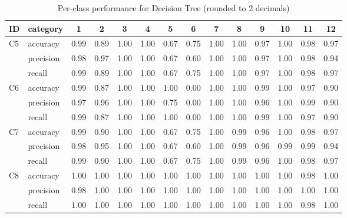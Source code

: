 \documentclass[11pt]{article}
\begin{document}
\begin{table} [h]
  \centering
  \begin{tabular}{llcccccccccccc}
      \toprule
      ID & category & 1 & 2 & 3 & 4 & 5 & 6 & 7 & 8 & 9 & 10 & 11 & 12 \\
      \midrule

      \multirow{3}{*}{C5}
        & accuracy  & 0.99 & 0.89 & 1.00 & 1.00 & 0.67 & 0.75 & 1.00 & 1.00 & 0.97 & 1.00 & 0.98 & 0.97 \\
        & precision & 0.98 & 0.97 & 1.00 & 1.00 & 0.67 & 0.60 & 1.00 & 1.00 & 0.97 & 1.00 & 0.98 & 0.94 \\
        & recall    & 0.99 & 0.89 & 1.00 & 1.00 & 0.67 & 0.75 & 1.00 & 1.00 & 0.97 & 1.00 & 0.98 & 0.97 \\
      \midrule

      \multirow{3}{*}{C6}
        & accuracy  & 0.99 & 0.87 & 1.00 & 1.00 & 1.00 & 0.00 & 1.00 & 1.00 & 0.99 & 1.00 & 0.97 & 0.90 \\
        & precision & 0.97 & 0.96 & 1.00 & 1.00 & 0.75 & 0.00 & 1.00 & 1.00 & 0.96 & 1.00 & 0.99 & 0.90 \\
        & recall    & 0.99 & 0.87 & 1.00 & 1.00 & 1.00 & 0.00 & 1.00 & 1.00 & 0.99 & 1.00 & 0.97 & 0.90 \\
      \midrule

      \multirow{3}{*}{C7}
        & accuracy  & 0.99 & 0.90 & 1.00 & 1.00 & 0.67 & 0.75 & 1.00 & 0.99 & 0.96 & 1.00 & 0.98 & 0.97 \\
        & precision & 0.98 & 0.95 & 1.00 & 1.00 & 0.67 & 0.60 & 1.00 & 0.99 & 0.96 & 0.99 & 0.99 & 0.94 \\
        & recall    & 0.99 & 0.90 & 1.00 & 1.00 & 0.67 & 0.75 & 1.00 & 0.99 & 0.96 & 1.00 & 0.98 & 0.97 \\
      \midrule

      \multirow{3}{*}{C8}
        & accuracy  & 1.00 & 1.00 & 1.00 & 1.00 & 1.00 & 1.00 & 1.00 & 1.00 & 1.00 & 1.00 & 0.98 & 1.00 \\
        & precision & 0.98 & 1.00 & 1.00 & 1.00 & 1.00 & 1.00 & 1.00 & 1.00 & 1.00 & 1.00 & 1.00 & 1.00 \\
        & recall    & 1.00 & 1.00 & 1.00 & 1.00 & 1.00 & 1.00 & 1.00 & 1.00 & 1.00 & 1.00 & 0.98 & 1.00 \\
  \end{tabular}
  \caption{Per-class performance for Decision Tree (rounded to 2 decimals)}
  \label{tab:table3}
\end{table}
\end{document}
